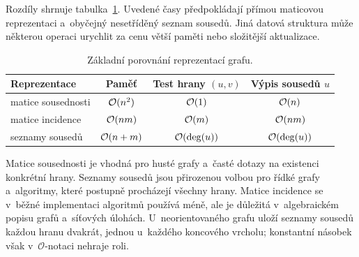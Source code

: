 Rozdíly shrnuje tabulka~\ref{tab:reprezentace-grafu}. Uvedené časy předpokládají přímou maticovou reprezentaci a~obyčejný nesetříděný seznam sousedů. Jiná datová struktura může některou operaci urychlit za cenu větší paměti nebo složitější aktualizace.

\begin{table}[ht]
    \centering
    \renewcommand{\arraystretch}{1.2}
    \begin{tabular}{lccc}
        \hline
        Reprezentace & Paměť & Test hrany \((u,v)\) & Výpis sousedů \(u\) \\
        \hline
        matice sousednosti & \(\mathcal{O}(n^2)\) & \(\mathcal{O}(1)\) & \(\mathcal{O}(n)\) \\
        matice incidence & \(\mathcal{O}(nm)\) & \(\mathcal{O}(m)\) & \(\mathcal{O}(nm)\) \\
        seznamy sousedů & \(\mathcal{O}(n+m)\) & \(\mathcal{O}(\deg(u))\) & \(\mathcal{O}(\deg(u))\) \\
        \hline
    \end{tabular}
    \caption{Základní porovnání reprezentací grafu.}
    \label{tab:reprezentace-grafu}
\end{table}

Matice sousednosti je vhodná pro husté grafy a~časté dotazy na existenci konkrétní hrany. Seznamy sousedů jsou přirozenou volbou pro řídké grafy a~algoritmy, které postupně procházejí všechny hrany. Matice incidence se v~běžné implementaci algoritmů používá méně, ale je důležitá v~algebraickém popisu grafů a~síťových úlohách. U~neorientovaného grafu uloží seznamy sousedů každou hranu dvakrát, jednou u~každého koncového vrcholu; konstantní násobek však v~\(\mathcal O\)-notaci nehraje roli.
